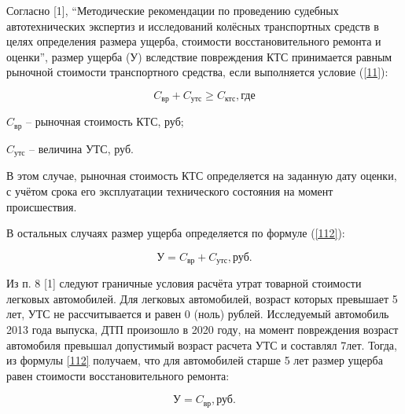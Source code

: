 \vspace{3mm}

\par Согласно [1], \enquote{Методические рекомендации по проведению судебных автотехнических экспертиз и исследований колёсных транспортных средств в целях определения размера ущерба, стоимости восстановительного ремонта и оценки}, размер ущерба (У) вследствие повреждения КТС принимается равным рыночной стоимости транспортного средства, если выполняется условие (\ref{11}):

\begin{equation}\label{11}
C_\text{вр} + C_\text{утс} \geq  C_\text{ктс},    \text{где}
\end{equation}

$ C_\text{вр}  $ -- рыночная стоимость КТС, руб;

$ C_\text{утс} $ --  величина УТС, руб.

В этом случае, рыночная стоимость КТС определяется на заданную дату оценки, с учётом срока его эксплуатации технического состояния на момент происшествия.

В остальных случаях размер ущерба определяется по формуле (\ref{112}):

\begin{equation}\label{112}
 \text{У} = C_\text{вр} + C_\text{утс},    \text{руб.}
\end{equation}

Из п. 8 [1]  следуют граничные условия расчёта утрат товарной стоимости легковых автомобилей.   Для легковых автомобилей, возраст которых превышает 5 лет, УТС не рассчитывается и равен 0 (ноль) рублей.  Исследуемый автомобиль 2013 года выпуска, ДТП произошло в 2020 году, на момент повреждения возраст автомобиля  превышал допустимый возраст расчета УТС и составлял 7лет.   Тогда, из формулы \ref{112} получаем, что для автомобилей старше 5 лет размер ущерба равен стоимости восстановительного ремонта:

\begin{equation}\label{113}
	\text{У} = C_\text{вр},    \text{руб.}
\end{equation}


